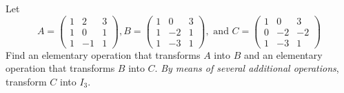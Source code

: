 \begin{exercise} \label{exercise 3.1.2}
Let
\[
    A = \left(\begin{array}{rrr}
        1 & 2 & 3 \\
        1 & 0 & 1 \\
        1 & -1 & 1
    \end{array}\right),
    B = \left(\begin{array}{rrr}
        1 & 0 & 3 \\
        1 & -2 & 1 \\
        1 & -3 & 1
    \end{array}\right), \text { and }
    C = \left(\begin{array}{rrr}
        1 & 0 & 3 \\
        0 & -2 & -2 \\
        1 & -3 & 1
    \end{array}\right)
\]
Find an elementary operation that transforms \(A\) into \(B\) and an elementary operation that transforms \(B\) into \(C\).
\emph{By means of several additional operations}, transform \(C\) into \(I_3\).
\end{exercise}

